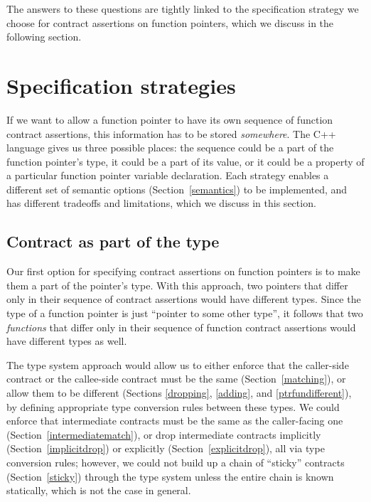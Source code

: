 The answers to these questions are tightly linked to the specification strategy we choose for contract assertions on function pointers, which we discuss in the following section.

\section{Specification strategies}
\label{wherelive}


If we want to allow a function pointer to have its own sequence of function contract assertions, this information has to be stored \emph{somewhere}. The C++ language gives us three possible places: the sequence could be a part of the function pointer's type, it could be a part of its value, or it could be a property of a particular function pointer variable declaration. Each strategy enables a different set of semantic options (Section~\ref{semantics}) to be implemented, and has different tradeoffs and limitations, which we discuss in this section.

\subsection{Contract as part of the type}
\label{type}

Our first option for specifying contract assertions on function pointers is to make them a part of the pointer's type. With this approach, two pointers that differ only in their sequence of contract assertions would have different types. Since the type of a function pointer is just ``pointer to some other type'', it follows that two \emph{functions} that differ only in their sequence of function contract assertions would have different types as well.

The type system approach would allow us to either enforce that the caller-side contract or the callee-side contract must be the same (Section~\ref{matching}), or allow them to be different (Sections \ref{dropping}, \ref{adding}, and \ref{ptrfundifferent}), by defining appropriate type conversion rules between these types. We could enforce that intermediate contracts must be the same as the caller-facing one (Section~\ref{intermediatematch}), or drop intermediate contracts implicitly (Section~\ref{implicitdrop}) or explicitly (Section~\ref{explicitdrop}), all via type conversion rules; however, we could not build up a chain of ``sticky'' contracts (Section~\ref{sticky}) through the type system unless the entire chain is known statically, which is not the case in general. 

